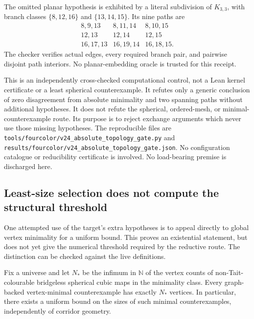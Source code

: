The omitted planar hypothesis is exhibited by a literal subdivision of
$K_{3,3}$, with branch classes $\{8,12,16\}$ and $\{13,14,15\}$.
Its nine paths are
\[
\begin{array}{lll}
8,9,13 & 8,11,14 & 8,10,15\\
12,13 & 12,14 & 12,15\\
16,17,13 & 16,19,14 & 16,18,15.
\end{array}
\]
The checker verifies actual edges, every required branch pair, and
pairwise disjoint path interiors. No planar-embedding oracle is trusted
for this receipt.

This is an independently cross-checked computational control, not a Lean
kernel certificate or a least spherical counterexample. It refutes only
a generic conclusion of zero disagreement from absolute minimality and
two spanning paths without additional hypotheses. It does not refute the
spherical, ordered-mesh, or minimal-counterexample route. Its purpose is
to reject exchange arguments which never use those missing hypotheses.
The reproducible files are
\texttt{tools/fourcolor/v24\_absolute\_topology\_gate.py} and
\texttt{results/fourcolor/v24\_absolute\_topology\_gate.json}.
No configuration catalogue or reducibility certificate is involved. No
load-bearing premise is discharged here.

\subsection{Least-size selection does not compute the structural threshold}
\label{sec:least-size-bound-audit}

One attempted use of the target's extra hypotheses is to appeal directly to
global vertex minimality for a uniform bound.  This proves an existential
statement, but does not yet give the numerical threshold required by the
reductive route.  The distinction can be checked against the live definitions.

\begin{proposition}
Fix a universe and let $N_*$ be the infimum in $\mathbb N$ of the vertex
counts of non-Tait-colourable bridgeless spherical cubic maps in the
minimality class.  Every graph-backed vertex-minimal counterexample has
exactly $N_*$ vertices.  In particular, there exists a uniform bound on the
sizes of such minimal counterexamples, independently of corridor geometry.
\end{proposition}

